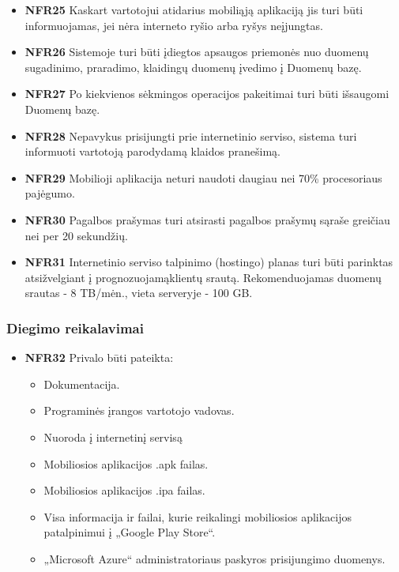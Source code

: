 \documentclass{VUMIFPSbakalaurinis}
\begin{document}
\begin{itemize}
	\item \textbf{NFR25} Kaskart vartotojui atidarius mobiliąją aplikaciją jis turi būti informuojamas, jei nėra interneto ryšio arba ryšys neįjungtas.
	\item \textbf{NFR26} Sistemoje turi būti įdiegtos apsaugos priemonės nuo duomenų sugadinimo, praradimo, klaidingų duomenų įvedimo į Duomenų bazę.
	\item \textbf{NFR27} Po kiekvienos sėkmingos operacijos pakeitimai turi būti išsaugomi Duomenų bazę.
	\item \textbf{NFR28} Nepavykus prisijungti prie internetinio serviso, sistema turi informuoti vartotoją parodydamą klaidos pranešimą.
\end{itemize}

\begin{itemize}
	\item \textbf{NFR29} Mobilioji aplikacija neturi naudoti daugiau nei 70\% procesoriaus pajėgumo.
	\item \textbf{NFR30} Pagalbos prašymas turi atsirasti pagalbos prašymų sąraše greičiau nei per 20 sekundžių.
	\item \textbf{NFR31} Internetinio serviso talpinimo (hostingo) planas turi būti parinktas atsižvelgiant į prognozuojamąklientų srautą. Rekomenduojamas duomenų srautas - 8 TB/mėn., vieta serveryje - 100 GB.
\end{itemize}

\subsubsection{Diegimo reikalavimai}
\begin{itemize}
	\item \textbf{NFR32} Privalo būti pateikta:
	\begin{itemize}
		\item Dokumentacija.
		\item Programinės įrangos vartotojo vadovas.
		\item Nuoroda į internetinį servisą
		\item Mobiliosios aplikacijos .apk failas.
		\item Mobiliosios aplikacijos .ipa failas.
		\item Visa informacija ir failai, kurie reikalingi mobiliosios aplikacijos patalpinimui į „Google Play Store“.
		\item „Microsoft Azure“ administratoriaus paskyros prisijungimo duomenys.
	\end{itemize}
\end{itemize}
\end{document}
